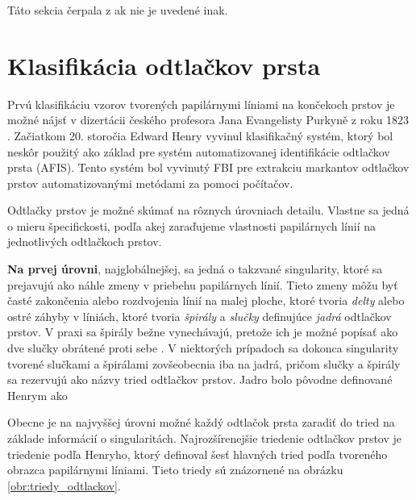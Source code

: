   Táto sekcia čerpala z \cite{Handbook} ak nie je uvedené inak.

  \section{Klasifikácia odtlačkov prsta} \label{sec:klasifikacia_odtl}
  Prvú klasifikáciu vzorov tvorených papilárnymi líniami na končekoch prstov je možné nájsť v dizertácii českého profesora Jana Evangelisty Purkyně
  z roku 1823 \cite{FingerprintSrcBook}. Začiatkom 20. storočia Edward Henry vyvinul klasifikačný systém, ktorý bol neskôr použitý ako základ pre systém
  automatizovanej identifikácie odtlačkov prsta (AFIS). Tento systém bol vyvinutý FBI pre extrakciu markantov odtlačkov prstov automatizovanými metódami
  za pomoci počítačov.

  Odtlačky prstov je možné skúmať na rôznych úrovniach detailu. Vlastne sa jedná o mieru špecifickosti, podľa akej zaraďujeme vlastnosti
  papilárnych línií na jednotlivých odtlačkoch prstov.

  \textbf{Na prvej úrovni}, najglobálnejšej, sa jedná o takzvané singularity, ktoré sa prejavujú ako náhle zmeny v priebehu papilárnych línií. Tieto 
  zmeny môžu byť časté zakončenia alebo rozdvojenia línií na malej ploche, ktoré tvoria \emph{delty} alebo ostré záhyby v líniách, 
  ktoré tvoria \emph{špirály} a \emph{slučky} definujúce \emph{jadrá} odtlačkov prstov. V praxi sa špirály bežne vynechávajú, pretože ich je možné popísať
  ako dve slučky obrátené proti sebe \cite{Handbook}. V niektorých prípadoch \cite{Drahansky, FingerprintSrcBook} sa dokonca singularity tvorené slučkami
  a špirálami zovšeobecnia iba na jadrá, pričom slučky a špirály sa rezervujú ako názvy tried odtlačkov prstov. Jadro bolo pôvodne definované Henrym \cite{Henry}
  ako 

  Obecne je na najvyššej úrovni možné každý odtlačok prsta zaradiť do tried na základe informácií o singularitách. Najrozšírenejšie triedenie odtlačkov
  prstov je triedenie podľa Henryho, ktorý definoval šesť hlavných tried podľa tvoreného obrazca papilárnymi líniami. Tieto triedy sú znázornené
  na obrázku \ref{obr:triedy_odtlackov}.

